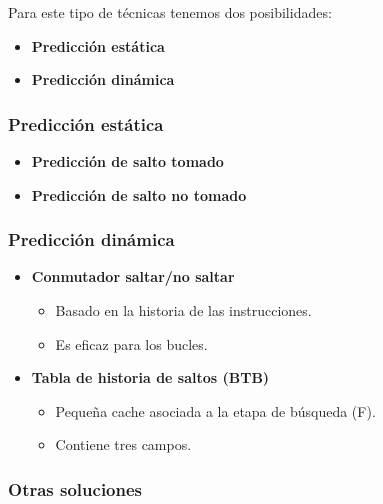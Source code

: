 Para este tipo de técnicas tenemos dos posibilidades:

\begin{itemize}
  \item \textbf{Predicción estática}
  \item \textbf{Predicción dinámica}
\end{itemize}

\subsubsection*{Predicción estática}

\begin{itemize}
  \item \textbf{Predicción de salto tomado}
  \item \textbf{Predicción de salto no tomado}
\end{itemize}

\subsubsection*{Predicción dinámica}

\begin{itemize}
  \item \textbf{Conmutador saltar/no saltar}
  \begin{itemize}
    \item Basado en la historia de las instrucciones.
    \item Es eficaz para los bucles.
  \end{itemize}
  \item \textbf{Tabla de historia de saltos (BTB)}
  \begin{itemize}
    \item Pequeña cache asociada a la etapa de búsqueda (F).
    \item Contiene tres campos.
  \end{itemize}
\end{itemize}

\subsubsection*{Otras soluciones}

